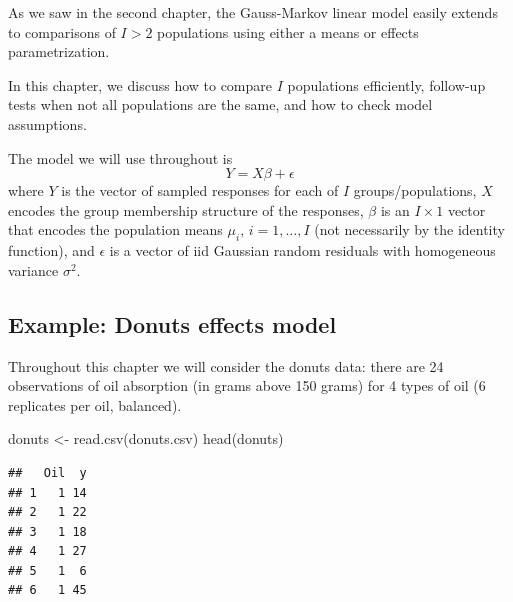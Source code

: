 \documentclass[
]{book}
\newenvironment{Shaded}{\begin{snugshade}}{\end{snugshade}}
\newcommand{\AttributeTok}[1]{\textcolor[rgb]{0.77,0.63,0.00}{#1}}
\newcommand{\FunctionTok}[1]{\textcolor[rgb]{0.00,0.00,0.00}{#1}}
\newcommand{\NormalTok}[1]{#1}
\newcommand{\OtherTok}[1]{\textcolor[rgb]{0.56,0.35,0.01}{#1}}
\newcommand{\SpecialCharTok}[1]{\textcolor[rgb]{0.00,0.00,0.00}{#1}}
\newcommand{\StringTok}[1]{\textcolor[rgb]{0.31,0.60,0.02}{#1}}
\begin{document}
As we saw in the second chapter, the Gauss-Markov linear model easily extends to comparisons of \(I>2\) populations using either a means or effects parametrization.

In this chapter, we discuss how to compare \(I\) populations efficiently, follow-up tests when not all populations are the same, and how to check model assumptions.

The model we will use throughout is
\[Y = X\beta + \epsilon\]
where \(Y\) is the vector of sampled responses for each of \(I\) groups/populations, \(X\) encodes the group membership structure of the responses, \(\beta\) is an \(I\times 1\) vector that encodes the population means \(\mu_i,\, i=1, \ldots, I\) (not necessarily by the identity function), and \(\epsilon\) is a vector of iid Gaussian random residuals with homogeneous variance \(\sigma^2\).

\hypertarget{example-donuts-effects-model}{%
\subsection{Example: Donuts effects model}\label{example-donuts-effects-model}}

Throughout this chapter we will consider the donuts data: there are 24 observations of oil absorption (in grams above 150 grams) for 4 types of oil (6 replicates per oil, balanced).

\begin{Shaded}
\begin{Highlighting}[]
\NormalTok{donuts }\OtherTok{\textless{}{-}} \FunctionTok{read.csv}\NormalTok{(}\StringTok{\textquotesingle{}donuts.csv\textquotesingle{}}\NormalTok{)}
\FunctionTok{head}\NormalTok{(donuts)}
\end{Highlighting}
\end{Shaded}

\begin{verbatim}
##   Oil  y
## 1   1 14
## 2   1 22
## 3   1 18
## 4   1 27
## 5   1  6
## 6   1 45
\end{verbatim}

\begin{Shaded}
\end{Shaded}
\end{document}

